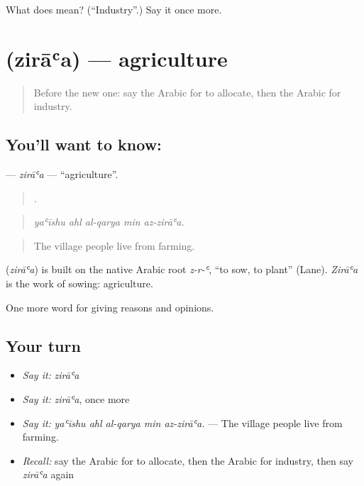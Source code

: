 \begin{tcolorbox}[breakable,colback=teal!4,colframe=teal!35!black,title={Before you move on}]
What does  mean? (\textquotedblleft{}Industry\textquotedblright{}.) Say it once more.
\end{tcolorbox}
\section[\texorpdfstring{\ar{زراعة} (zirāʿa)}{زراعة (zirāʿa)}]{ (zirāʿa) — agriculture}

\label{lesson:AR-C384-ziraa}



\begin{quote}
Before the new one: say the Arabic for to allocate, then the Arabic for industry.
\end{quote}

\subsection*{You'll want to know: }
\textbf{} — \emph{zirāʿa} — \textquotedblleft{}agriculture\textquotedblright{}.

\begin{quote}
    .
\end{quote}

\begin{quote}
\emph{yaʿīshu ahl al-qarya min az-zirāʿa.}
\end{quote}

\begin{quote}
The village people live from farming.
\end{quote}

\begin{cousinweb}
\textbf{} (\emph{zirāʿa}) is built on the native Arabic root \emph{z-r-ʿ}, \textquotedblleft{}to sow, to plant\textquotedblright{} (Lane). \emph{Zirāʿa} is the work of sowing: agriculture.
\end{cousinweb}

\begin{grammarlens}[title={What you've built}]
One more word for giving reasons and opinions.
\end{grammarlens}

\subsection*{Your turn}
\begin{itemize}
\raggedright
  \item \emph{Say it:} \emph{zirāʿa}
  \item \emph{Say it:} \emph{zirāʿa}, once more
  \item \emph{Say it:} \emph{yaʿīshu ahl al-qarya min az-zirāʿa.} — The village people live from farming.
  \item \emph{Recall:} say the Arabic for to allocate, then the Arabic for industry, then say \emph{zirāʿa} again
\end{itemize}

